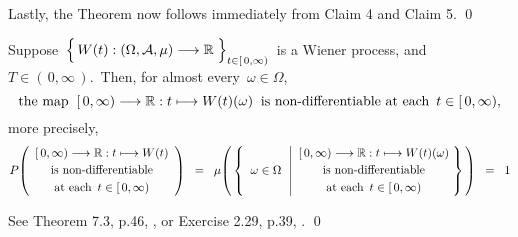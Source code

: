 \vskip 0.5cm
\noindent
Lastly, the Theorem now follows immediately from Claim 4 and Claim 5.
\qed


\vskip 1.0cm
\begin{theorem}
\label{WienerProcessHasNowhereDifferentiableSamplePaths}
\mbox{}
\vskip 0.2cm
\noindent
Suppose
\,$\left\{\,\overset{{\color{white}.}}{W}(t) : (\Omega,\mathcal{A},\mu) \longrightarrow \Re \;\right\}_{t \in[\,0,\infty)}$\,
is a Wiener process,
and \,$T \in (\,0,\infty\,)$.\,
Then, for almost every \,$\omega \in \Omega$,
\begin{equation*}
\textnormal{the map}\;\;
[\,0,\infty) \longrightarrow \Re : t \longmapsto W(t)(\omega)
\;\;\textnormal{is non-differentiable at each \,$t \in [\,0,\infty)$},
\end{equation*}
more precisely,
\begin{equation*}
P\!\left(
	\begin{array}{c}
	[\,0,\infty) \longrightarrow \Re : t \longmapsto W(t)
	\\
	\overset{{\color{white}.}}{\textnormal{is non-differentiable}}
	\\
	\overset{{\color{white}.}}{\textnormal{at each \,$t \in [\,0,\infty)$}}
	\end{array}
	\right)
\;\; = \;\;
	\mu\!\left(\,\left\{\;\;
		\omega \in \Omega
		\,\;\left\vert
		\begin{array}{c}
			[\,0,\infty) \longrightarrow \Re : t \longmapsto W(t)(\omega)
			\\
			\overset{{\color{white}.}}{\textnormal{is non-differentiable}}
			\\
			\overset{{\color{white}.}}{\textnormal{at each \,$t \in [\,0,\infty)$}}
			\end{array}
			\right.
		\!\!\right\}\,\right)
\;\; = \;\;
	1
\end{equation*}
\end{theorem}
\proof
See Theorem 7.3, p.46, \cite{Bass2011}, or Exercise 2.29, p.39, \cite{LeGall2016}.
\qed

